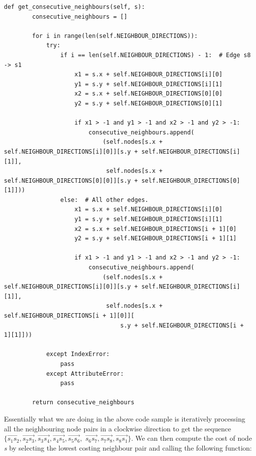 \begin{lstlisting}
def get_consecutive_neighbours(self, s):
        consecutive_neighbours = []

        for i in range(len(self.NEIGHBOUR_DIRECTIONS)):
            try:
                if i == len(self.NEIGHBOUR_DIRECTIONS) - 1:  # Edge s8 -> s1
                    x1 = s.x + self.NEIGHBOUR_DIRECTIONS[i][0]
                    y1 = s.y + self.NEIGHBOUR_DIRECTIONS[i][1]
                    x2 = s.x + self.NEIGHBOUR_DIRECTIONS[0][0]
                    y2 = s.y + self.NEIGHBOUR_DIRECTIONS[0][1]

                    if x1 > -1 and y1 > -1 and x2 > -1 and y2 > -1:
                        consecutive_neighbours.append(
                            (self.nodes[s.x + self.NEIGHBOUR_DIRECTIONS[i][0]][s.y + self.NEIGHBOUR_DIRECTIONS[i][1]],
                             self.nodes[s.x + self.NEIGHBOUR_DIRECTIONS[0][0]][s.y + self.NEIGHBOUR_DIRECTIONS[0][1]]))
                else:  # All other edges.
                    x1 = s.x + self.NEIGHBOUR_DIRECTIONS[i][0]
                    y1 = s.y + self.NEIGHBOUR_DIRECTIONS[i][1]
                    x2 = s.x + self.NEIGHBOUR_DIRECTIONS[i + 1][0]
                    y2 = s.y + self.NEIGHBOUR_DIRECTIONS[i + 1][1]

                    if x1 > -1 and y1 > -1 and x2 > -1 and y2 > -1:
                        consecutive_neighbours.append(
                            (self.nodes[s.x + self.NEIGHBOUR_DIRECTIONS[i][0]][s.y + self.NEIGHBOUR_DIRECTIONS[i][1]],
                             self.nodes[s.x + self.NEIGHBOUR_DIRECTIONS[i + 1][0]][
                                 s.y + self.NEIGHBOUR_DIRECTIONS[i + 1][1]]))

            except IndexError:
                pass
            except AttributeError:
                pass

        return consecutive_neighbours
\end{lstlisting}

\noindent
Essentially what we are doing in the above code sample is iteratively processing all the neighbouring node pairs in a clockwise direction to get the sequence $\lbrace \overrightarrow{s_{1}s_{2}}, \overrightarrow{s_{2}s_{3}}, \overrightarrow{s_{3}s_{4}}, \overrightarrow{s_{4}s_{5}}, \overrightarrow{s_{5}s_{6}},$ $\overrightarrow{s_{6}s_{7}}, \overrightarrow{s_{7}s_{8}}, \overrightarrow{s_{8}s_{1}} \rbrace$. We can then compute the cost of node \textit{s} by selecting the lowest costing neighbour pair and calling the following function: \\

